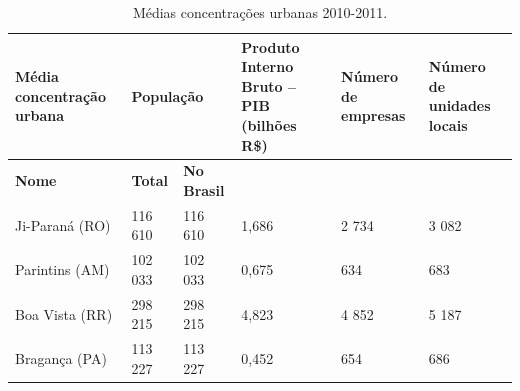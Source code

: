 \begin{table}[htb]
	\ABNTEXfontereduzida
	\caption{\label{tab:Tab_1}Médias concentrações urbanas 2010-2011.}
	\begin{tabular}{@{}p{3.0cm}p{1.5cm}p{2cm}p{2.5cm}p{2.5cm}p{2.5cm}@{}}
		\toprule
		\textbf{Média concentração urbana} & \multicolumn{2}{l}{\textbf{População}} & \textbf{Produto Interno Bruto – PIB (bilhões R\$)} & \textbf{Número de empresas} & \textbf{Número de unidades locais}         \\ \midrule
		\textbf{Nome}                      & \textbf{Total}                         & \textbf{No Brasil}                                 &                             &                                    &       \\
		Ji-Paraná (RO)                     & 116 610                                & 116 610                                            & 1,686                       & 2 734                              & 3 082 \\
		Parintins (AM)                     & 102 033                                & 102 033                                            & 0,675                       & 634                                & 683   \\
		Boa Vista (RR)                     & 298 215                                & 298 215                                            & 4,823                       & 4 852                              & 5 187 \\
		Bragança (PA)                      & 113 227                                & 113 227                                            & 0,452                       & 654                                & 686   \\ \bottomrule
	\end{tabular}
\end{table}